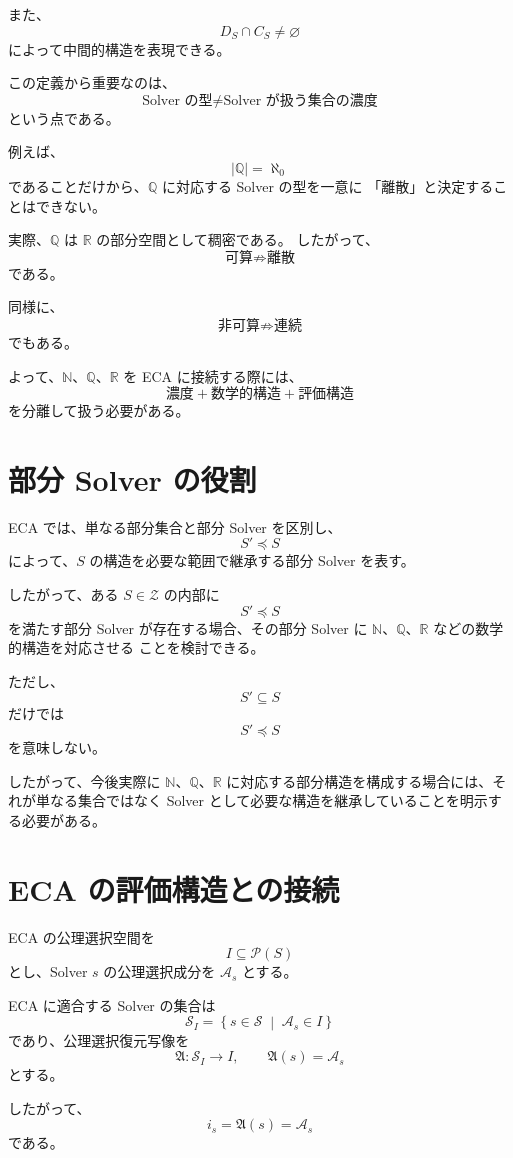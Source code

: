 \documentclass[a4paper,11pt]{article}
\begin{document}
また、
\[
D_S\cap C_S\neq\varnothing
\]
によって中間的構造を表現できる。

この定義から重要なのは、
\[
\boxed{
\text{Solver の型}
\neq
\text{Solver が扱う集合の濃度}
}
\]
という点である。

例えば、
\[
|\mathbb{Q}|=\aleph_0
\]
であることだけから、$\mathbb{Q}$ に対応する Solver の型を一意に
「離散」と決定することはできない。

実際、$\mathbb{Q}$ は $\mathbb{R}$ の部分空間として稠密である。
したがって、
\[
\text{可算}\not\Rightarrow\text{離散}
\]
である。

同様に、
\[
\text{非可算}\not\Rightarrow\text{連続}
\]
でもある。

よって、$\mathbb{N}$、$\mathbb{Q}$、$\mathbb{R}$ を ECA に接続する際には、
\[
\boxed{
\text{濃度}
+
\text{数学的構造}
+
\text{評価構造}
}
\]
を分離して扱う必要がある。

\section{部分 Solver の役割}

ECA では、単なる部分集合と部分 Solver を区別し、
\[
S'\preceq S
\]
によって、$S$ の構造を必要な範囲で継承する部分 Solver を表す。

したがって、ある $S\in\mathcal{Z}$ の内部に
\[
S'\preceq S
\]
を満たす部分 Solver が存在する場合、その部分 Solver に
$\mathbb{N}$、$\mathbb{Q}$、$\mathbb{R}$ などの数学的構造を対応させる
ことを検討できる。

ただし、
\[
S'\subseteq S
\]
だけでは
\[
S'\preceq S
\]
を意味しない。

したがって、今後実際に $\mathbb{N}$、$\mathbb{Q}$、$\mathbb{R}$ に対応する部分構造を構成する場合には、それが単なる集合ではなく Solver として必要な構造を継承していることを明示する必要がある。

\section{ECA の評価構造との接続}

ECA の公理選択空間を
\[
I\subseteq\mathcal{P}(S)
\]
とし、Solver $s$ の公理選択成分を $\mathcal{A}_s$ とする。

ECA に適合する Solver の集合は
\[
\mathcal{S}_I
=
\left\{
s\in\mathcal{S}
\;\middle|\;
\mathcal{A}_s\in I
\right\}
\]
であり、公理選択復元写像を
\[
\mathfrak{A}:\mathcal{S}_I\longrightarrow I,
\qquad
\mathfrak{A}(s)=\mathcal{A}_s
\]
とする。

したがって、
\[
i_s=\mathfrak{A}(s)=\mathcal{A}_s
\]
である。
\end{document}
